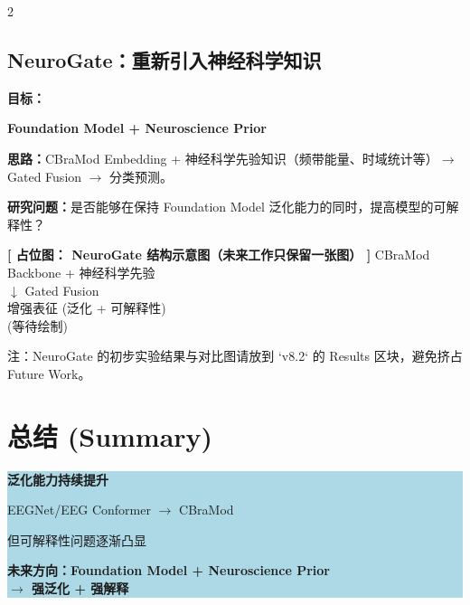 \documentclass[12pt, a0paper]{article}
\renewcommand{\large}{\fontsize{28}{36}\selectfont}
\renewcommand{\Large}{\fontsize{34}{42}\selectfont}
\renewcommand{\LARGE}{\fontsize{40}{48}\selectfont}
\renewcommand{\small}{\fontsize{18}{24}\selectfont}
\newcommand{\placeholderh}[3]{%
    \begin{center}
    \colorbox{mygray!12}{\parbox{0.9\columnwidth}{%
        \centering
        \vspace{1.2em}
        {\Large\bfseries\color{mygray} [ 占位图： #1 ]}
        \vspace{0.8em}
        {\small\color{mygray} #2}
        \vspace{#3}
    }}
    \end{center}
}
\begin{document}
\begin{multicols}{2}
\subsection{NeuroGate：重新引入神经科学知识}

\textbf{目标：}

\begin{center}
\Large\bfseries
Foundation Model \quad + \quad Neuroscience Prior
\end{center}

\textbf{思路：}CBraMod Embedding + 神经科学先验知识（频带能量、时域统计等）$\rightarrow$ Gated Fusion $\rightarrow$ 分类预测。

\vspace{1em}

\textbf{研究问题：}是否能够在保持 Foundation Model 泛化能力的同时，提高模型的可解释性？

\placeholderh{NeuroGate 结构示意图（未来工作只保留一张图）}{%
    CBraMod Backbone + 神经科学先验\\
    $\downarrow$ Gated Fusion\\
    增强表征 (泛化 + 可解释性)\\
    \small (等待绘制)}{3.5cm}

{\small\color{mygray}注：NeuroGate 的初步实验结果与对比图请放到 `v8.2` 的 Results 区块，避免挤占 Future Work。}

\section{总结 (Summary)}

\begin{center}
\colorbox{lightblue}{\parbox{0.95\columnwidth}{\centering
    {\LARGE\bfseries
        泛化能力持续提升\par}
    \vspace{1.5em}
    {\large
        EEGNet/EEG Conformer $\rightarrow$ CBraMod\par}
    \vspace{1em}
    {\large
        但可解释性问题逐渐凸显\par}
    \vspace{1.5em}
    {\large\bfseries
        未来方向：Foundation Model + Neuroscience Prior\\[2mm]
        $\rightarrow$ 强泛化 + 强解释\par}
}}
\end{center}


\end{multicols}
\end{document}

